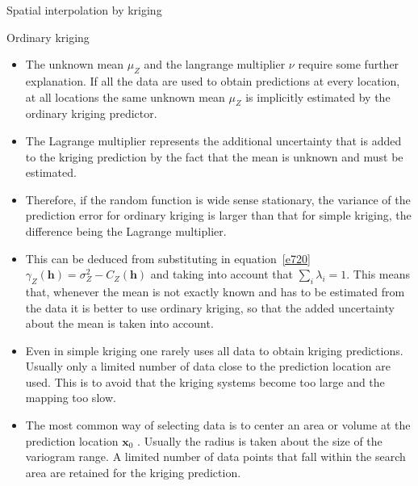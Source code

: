\documentclass[8pt]{beamer}
\renewcommand{\emph}[1]{\textcolor{myorange}{#1}}
\begin{document}
 \begin{frame}{Spatial interpolation by kriging}
     \begin{block}{Ordinary kriging}
    \end{block}
    \begin{itemize}
        \item The unknown \emph{mean} $\mu_Z$ and the \emph{langrange multiplier} $\nu$ require some further explanation. If all the data are used to obtain predictions at every location, at all locations the same unknown \emph{mean} $\mu_Z$ is implicitly estimated by the \emph{ordinary kriging predictor}.
        \item The \emph{Lagrange multiplier} represents the additional uncertainty that is added to the \emph{kriging prediction} by the fact that the \emph{mean} is unknown and must be estimated.
        \item Therefore, if the \emph{random function} is \emph{wide sense stationary}, the \emph{variance} of the \emph{prediction error} for \emph{ordinary kriging} is larger than that for \emph{simple kriging}, the difference being the \emph{Lagrange multiplier}.
        \item This can be deduced from substituting in equation~\ref{e720} $\gamma_Z (\mathbf{h}) = \sigma_Z^2 - C_Z(\mathbf{h})$ and taking into account that $\sum_i \lambda_i = 1$. This means that, whenever the \emph{mean} is not exactly known and has to be estimated from the data it is better to use \emph{ordinary kriging}, so that the added uncertainty about the \emph{mean} is taken into account.
        \item Even in \emph{simple kriging} one rarely uses all data to obtain \emph{kriging predictions}. Usually only a limited number of data close to the \emph{prediction location} are used. This is to avoid that the \emph{kriging systems} become too large and the mapping too slow.
        \item The most common way of selecting data is to center an \emph{area} or \emph{volume} at the \emph{prediction location} $\mathbf{x}_0$ . Usually the \emph{radius} is taken about the size of the \emph{variogram range}. A limited number of data points that fall within the \emph{search area} are retained for the \emph{kriging prediction}.
    \end{itemize}
   \end{frame}
 
\end{document}
